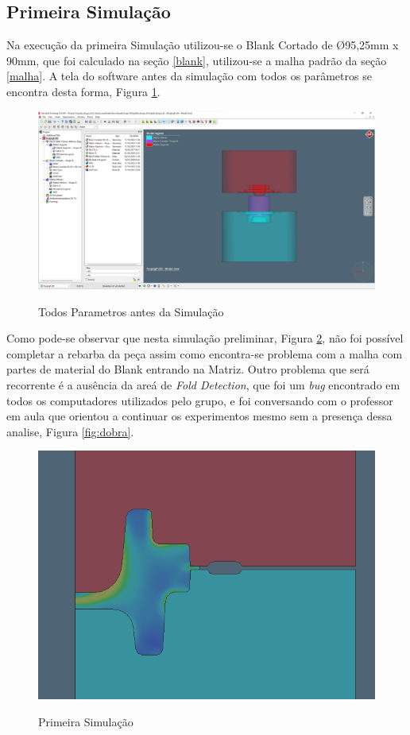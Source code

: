 \documentclass[deposito, acronym, symbols]{fei}
\begin{document}
\newpage

\subsection{Primeira Simulação}

Na execução da primeira Simulação utilizou-se o Blank Cortado de Ø95,25mm x 90mm, que foi calculado na seção \ref{blank}, utilizou-se a malha padrão da seção \ref{malha}. A tela do software antes da simulação com todos os parâmetros se encontra desta forma, Figura \ref{fig:tela}.

\begin{figure}[!htp]
    \centering
    \caption{Todos Parametros antes da Simulação}
    \includegraphics[width=0.7\linewidth]{Imagens/Simufact - Todos os parametros.png}
    \label{fig:tela}
\end{figure}

Como pode-se observar que nesta simulação preliminar, Figura \ref{fig:1simu}, não foi possível completar a rebarba da peça assim como encontra-se problema com a malha com partes de material do Blank entrando na Matriz. Outro problema que será recorrente é a ausência da areá de \textit{Fold Detection}, que foi um \textit{bug} encontrado em todos os computadores utilizados pelo grupo, e foi conversando com o professor em aula que orientou a continuar os experimentos mesmo sem a presença dessa analise, Figura \ref{fig:dobra}.

\begin{figure}[!htp]
    \centering
    \caption{Primeira Simulação}
    \includegraphics[width=0.7\linewidth]{Imagens/Simufact - 1º Simulação malha padrão.png}
    \label{fig:1simu}
\end{figure}
\end{document}
